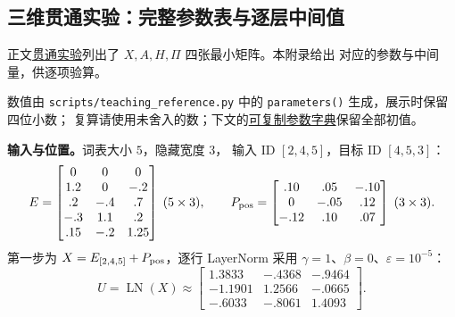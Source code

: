 \subsection{三维贯通实验：完整参数表与逐层中间值}
\label{app:transformer-intermediates}

正文\hyperref[intro:transformer-forward-pass]{贯通实验}列出了
$X,A,H,\Pi$ 四张最小矩阵。本附录给出
对应的参数与中间量，供逐项验算。

数值由 \nolinkurl{scripts/teaching_reference.py} 中的
\texttt{parameters()} 生成，展示时保留四位小数；
复算请使用未舍入的数；下文的\hyperref[app:parameter-literal]{可复制参数字典}保留全部初值。

\textbf{输入与位置。}词表大小 $5$，隐藏宽度 $3$，
输入 ID $[2,4,5]$，目标 ID $[4,5,3]$：
\[
E=\begin{bmatrix}
0&0&0\\1.2&0&-.2\\.2&-.4&.7\\-.3&1.1&.2\\.15&-.2&1.25
\end{bmatrix}\;(5\times3),\qquad
P_{\rm pos}=\begin{bmatrix}
.10&.05&-.10\\0&-.05&.12\\-.12&.10&.07
\end{bmatrix}\;(3\times3).
\]
第一步为 $X=E_{[2,4,5]}+P_{\rm pos}$，逐行 LayerNorm
采用 $\gamma=1$、$\beta=0$、$\varepsilon=10^{-5}$：
\[
U=\operatorname{LN}(X)\approx
\begin{bmatrix}
1.3833&-.4368&-.9464\\
-1.1901&1.2566&-.0665\\
-.6033&-.8061&1.4093
\end{bmatrix}.
\]

